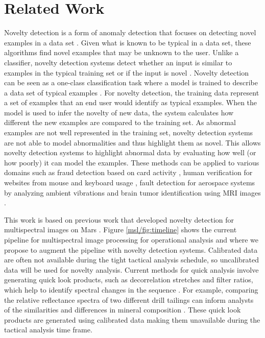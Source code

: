 \section{Related Work}
Novelty detection is a form of anomaly detection that focuses on detecting novel examples in a data set \citep{domingues2019comparative}. 
Given what is known to be typical in a data set, these algorithms find novel examples that may be unknown to the user.
Unlike a classifier, novelty detection systems detect whether an input is similar to examples in the typical training set or if the input is novel \citep{markou2003novelty}.
Novelty detection can be seen as a one-class classification task where a model is trained to describe a data set of typical examples \citep{pimentel2014review}. 
For novelty detection, the training data represent a set of examples that an end user would identify as typical examples. 
When the model is used to infer the novelty of new data, the system calculates how different the new examples are compared to the training set. 
As abnormal examples are not well represented in the training set, novelty detection systems are not able to model abnormalities and thus highlight them as novel. 
This allows novelty detection systems to highlight abnormal data by evaluating how well (or how poorly) it can model the examples. 
These methods can be applied to various domains such as fraud detection based on card activity \citep{oosterlinck2020one}, human verification for websites from mouse and keyboard usage \citep{kim2018keystroke}, fault detection for aerospace systems by analyzing ambient vibrations \citep{worden1997structural} and brain tumor identification using MRI images \citep{wang2020brain}.

This work is based on previous work that developed novelty detection for multispectral images on Mars \citep{kerner2020comparison}.
Figure \ref{msl/fig:timeline} shows the current pipeline for multispectral image processing for operational analysis and where we propose to augment the pipeline with novelty detection systems. 
Calibrated data are often not available during the tight tactical analysis schedule, so uncalibrated data will be used for novelty analysis. 
Current methods for quick analysis involve generating quick look products, such as decorrelation stretches and filter ratios, which help to identify spectral changes in the sequence \citep{gillespie1986color}.
For example, comparing the relative reflectance spectra of two different drill tailings can inform analysts of the similarities and differences in mineral composition \citep{wellington2017visible}.
These quick look products are generated using calibrated data making them unavailable during the tactical analysis time frame.  

